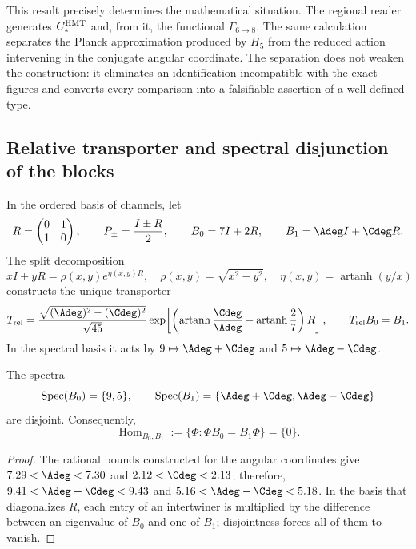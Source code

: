 This result precisely determines the mathematical situation. The regional
reader generates \(C_*^{\rm HMT}\) and, from it, the functional
\(\Gamma_{6\to8}\). The same calculation separates the Planck approximation
produced by \(H_5\) from the reduced action intervening in
the conjugate angular coordinate. The separation does not weaken the construction: it eliminates an
identification incompatible with the exact figures and converts every
comparison into a falsifiable assertion of a well-defined type.

\subsection{Relative transporter and spectral disjunction of the blocks}
\label{p12-83-c13-s3:sec:transportador-relativo-split}

In the ordered basis of channels, let
\[
 R=\begin{pmatrix}0&1\\1&0\end{pmatrix},
 \qquad P_\pm=\frac{I\pm R}{2},
 \qquad
 B_0=7I+2R,
 \qquad B_1=\Adeg I+\Cdeg R.
\]
The split decomposition
\[
 xI+yR=\rho(x,y)e^{\eta(x,y)R},
 \quad \rho(x,y)=\sqrt{x^2-y^2},
 \quad \eta(x,y)=\operatorname{artanh}(y/x)
\]
constructs the unique transporter
\[
 T_{\rm rel}
 =\frac{\sqrt{(\Adeg)^2-(\Cdeg)^2}}{\sqrt{45}}
   \exp\!\left[
   \left(\operatorname{artanh}\frac{\Cdeg}{\Adeg}
   -\operatorname{artanh}\frac27\right)R\right],
 \qquad T_{\rm rel}B_0=B_1.
\]
In the spectral basis it acts by
\(9\mapsto\Adeg+\Cdeg\) and
\(5\mapsto\Adeg-\Cdeg\).

\begin{theorem}
\label{p12-83-c13-s3:thm:no-go-entrelazador-bloques-split}
The spectra
\[
 \operatorname{Spec}(B_0)=\{9,5\},\qquad
 \operatorname{Spec}(B_1)=\{\Adeg+\Cdeg,\Adeg-\Cdeg\}
\]
are disjoint. Consequently,
\[
 \operatorname{Hom}_{B_0,B_1}
 :=\{\Phi:\Phi B_0=B_1\Phi\}=\{0\}.
\]
\end{theorem}

\begin{proof}
The rational bounds constructed for the angular coordinates give
\(7.29<\Adeg<7.30\) and \(2.12<\Cdeg<2.13\); therefore,
\(9.41<\Adeg+\Cdeg<9.43\) and
\(5.16<\Adeg-\Cdeg<5.18\). In the basis that diagonalizes \(R\), each entry
of an intertwiner is multiplied by the difference between an eigenvalue
of \(B_0\) and one of \(B_1\); disjointness forces all of them to vanish.
\end{proof}

